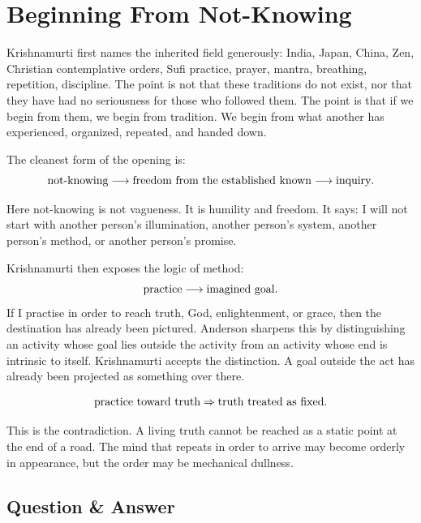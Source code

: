 \documentclass[11pt,oneside]{book}
\begin{document}
\section{Beginning From Not-Knowing}

Krishnamurti first names the inherited field generously: India, Japan, China, Zen, Christian contemplative orders, Sufi practice, prayer, mantra, breathing, repetition, discipline. The point is not that these traditions do not exist, nor that they have had no seriousness for those who followed them. The point is that if we begin from them, we begin from tradition. We begin from what another has experienced, organized, repeated, and handed down.

The cleanest form of the opening is:
\begin{equation}
\hbox{not-knowing}
\longrightarrow
\hbox{freedom from the established known}
\longrightarrow
\hbox{inquiry}.
\end{equation}

Here not-knowing is not vagueness. It is humility and freedom. It says: I will not start with another person's illumination, another person's system, another person's method, or another person's promise.

Krishnamurti then exposes the logic of method:
\begin{equation}
\hbox{practice}
\longrightarrow
\hbox{imagined goal}.
\end{equation}
If I practise in order to reach truth, God, enlightenment, or grace, then the destination has already been pictured. Anderson sharpens this by distinguishing an activity whose goal lies outside the activity from an activity whose end is intrinsic to itself. Krishnamurti accepts the distinction. A goal outside the act has already been projected as something over there.

\begin{equation}
\hbox{practice toward truth}
\Rightarrow
\hbox{truth treated as fixed}.
\end{equation}

This is the contradiction. A living truth cannot be reached as a static point at the end of a road. The mind that repeats in order to arrive may become orderly in appearance, but the order may be mechanical dullness.

\subsection{Question \& Answer}
\end{document}
